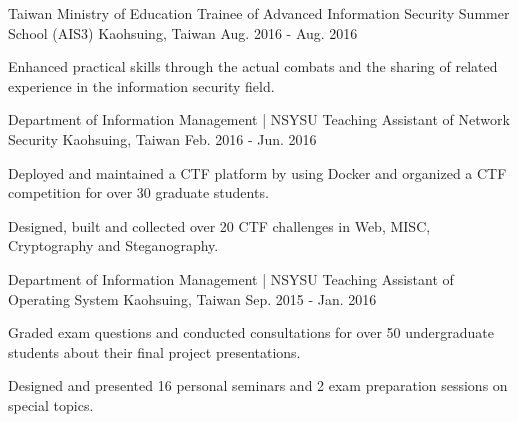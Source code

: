 \begin{cventries}

\cventry
{Taiwan Ministry of Education} %
{Trainee of Advanced Information Security Summer School (AIS3)} %
{Kaohsuing, Taiwan} %
{Aug. 2016 - Aug. 2016} %
{ %
\begin{cvitems}
\item {Enhanced practical skills through the actual combats and the sharing of related experience in the information security field.}
\end{cvitems}
}


\cventry
{Department of Information Management | NSYSU} %
{Teaching Assistant of Network Security} %
{Kaohsuing, Taiwan} %
{Feb. 2016 - Jun. 2016} %
{ %
\begin{cvitems}
\item {Deployed and maintained a CTF platform by using Docker and organized a CTF competition for over 30 graduate students.}
\item {Designed, built and collected over 20 CTF challenges in Web, MISC, Cryptography and Steganography.}
\end{cvitems}
}


\cventry
{Department of Information Management | NSYSU} %
{Teaching Assistant of Operating System} %
{Kaohsuing, Taiwan} %
{Sep. 2015 - Jan. 2016} %
{ %
\begin{cvitems}
\item {Graded exam questions and conducted consultations for over 50 undergraduate students about their final project presentations.}
\item {Designed and presented 16 personal seminars and 2 exam preparation sessions on special topics.}
\end{cvitems}
}

\end{cventries}
